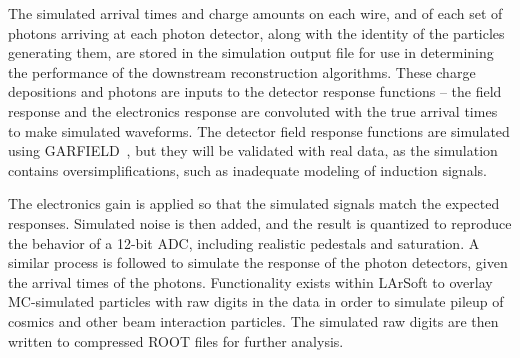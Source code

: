 The simulated arrival times and charge amounts on each wire, and of
each set of photons arriving at each photon detector, along with the
identity of the particles generating them, are stored in the
simulation output file for use in determining the performance of the
downstream reconstruction algorithms.  These charge depositions and
photons are inputs to the detector response functions -- the field
response and the electronics response are convoluted with the true
arrival times to make simulated waveforms.  The detector field
response functions are simulated using GARFIELD~\cite{garfield}, but
they will be validated with real data, as the simulation contains
oversimplifications, such as inadequate modeling of induction signals.  

The electronics gain is applied so that the
simulated signals match the expected responses.  Simulated noise is
then added, and the result is quantized to reproduce the behavior of a
12-bit ADC, including realistic pedestals and saturation.  A similar
process is followed to simulate the response of the photon detectors,
given the arrival times of the photons.  Functionality exists within
LArSoft to overlay MC-simulated particles with raw digits in
the data in order to simulate pileup of cosmics and other beam
interaction particles. The simulated raw digits are then written to
compressed ROOT files for further analysis.

